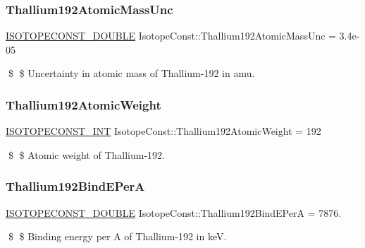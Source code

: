 \subsubsection{\texorpdfstring{Thallium192\+Atomic\+Mass\+Unc}{Thallium192AtomicMassUnc}}
{\footnotesize\ttfamily \mbox{\hyperlink{group___isotope_const-_macros_ga8f45a7272ce02c0b4c65c44636ed719a}{I\+S\+O\+T\+O\+P\+E\+C\+O\+N\+S\+T\+\_\+\+D\+O\+U\+B\+LE}} Isotope\+Const\+::\+Thallium192\+Atomic\+Mass\+Unc = 3.\+4e-\/05}

\$ \$ Uncertainty in atomic mass of Thallium-\/192 in amu. \mbox{\label{group___isotope_const-_thallium-_tl192_ga2befeb5b873a54bad5f0e8648dbe4e79}} 
\subsubsection{\texorpdfstring{Thallium192\+Atomic\+Weight}{Thallium192AtomicWeight}}
{\footnotesize\ttfamily \mbox{\hyperlink{group___isotope_const-_macros_ga5f18360b3e99483a35c32d789e62621c}{I\+S\+O\+T\+O\+P\+E\+C\+O\+N\+S\+T\+\_\+\+I\+NT}} Isotope\+Const\+::\+Thallium192\+Atomic\+Weight = 192}

\$ \$ Atomic weight of Thallium-\/192. \mbox{\label{group___isotope_const-_thallium-_tl192_ga395d1aba2f390ec57912227a93694e13}} 
\subsubsection{\texorpdfstring{Thallium192\+Bind\+E\+PerA}{Thallium192BindEPerA}}
{\footnotesize\ttfamily \mbox{\hyperlink{group___isotope_const-_macros_ga8f45a7272ce02c0b4c65c44636ed719a}{I\+S\+O\+T\+O\+P\+E\+C\+O\+N\+S\+T\+\_\+\+D\+O\+U\+B\+LE}} Isotope\+Const\+::\+Thallium192\+Bind\+E\+PerA = 7876.}

\$ \$ Binding energy per A of Thallium-\/192 in keV. \mbox{\label{group___isotope_const-_thallium-_tl192_gadec05fefe86c7c4f53c2d586fb426390}} 
